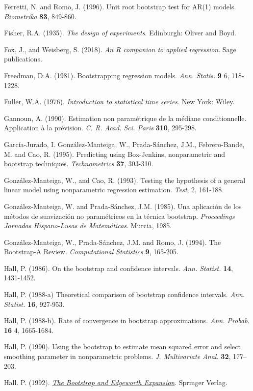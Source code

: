 \documentclass[
]{book}
\theoremstyle{break}
\theoremstyle{nonumberplain}
\begin{document}
Ferretti, N. and Romo, J. (1996). Unit root bootstrap test for AR(1)
models. \emph{Biometrika} \textbf{83}, 849-860.

Fisher, R.A. (1935). \emph{The design of experiments}. Edinburgh: Oliver and Boyd.

Fox, J., and Weisberg, S. (2018). \emph{An R companion to applied regression}. Sage publications.

Freedman, D.A. (1981). Bootstrapping regression models.
\emph{Ann. Statis.} \textbf{9} 6, 118-1228.

Fuller, W.A. (1976). \emph{Introduction to statistical time series}. New York:
Wiley.

Gannoun, A. (1990). Estimation non paramétrique de la médiane
conditionnelle. Application à la prévision. \emph{C. R. Acad. Sci. Paris}
\textbf{310}, 295-298.

García-Jurado, I. González-Manteiga, W., Prada-Sánchez, J.M.,
Febrero-Bande, M. and Cao, R. (1995). Predicting using Box-Jenkins,
nonparametric and bootstrap techniques. \emph{Technometrics} \textbf{37}, 303-310.

González-Manteiga, W., and Cao, R. (1993). Testing the hypothesis of a general linear model using nonparametric regression estimation. \emph{Test}, 2, 161-188.

González-Manteiga, W. and Prada-Sánchez, J.M. (1985). Una aplicación de
los métodos de suavización no paramétricos en la técnica bootstrap.
\emph{Proceedings Jornadas Hispano-Lusas de Matemáticas}. Murcia, 1985.

González-Manteiga, W., Prada-Sánchez, J.M. and Romo, J. (1994). The
Bootstrap-A Review. \emph{Computational Statistics} \textbf{9}, 165-205.

Hall, P. (1986). On the bootstrap and confidence intervals.
\emph{Ann. Statist.} \textbf{14}, 1431-1452.

Hall, P. (1988-a) Theoretical comparison of bootstrap confidence
intervals. \emph{Ann. Statist.} \textbf{16}, 927-953.

Hall, P. (1988-b). Rate of convergence in bootstrap approximations.
\emph{Ann. Probab.} \textbf{16} 4, 1665-1684.

Hall, P. (1990). Using the bootstrap to estimate mean squared error and
select smoothing parameter in nonparametric problems.
\emph{J. Multivariate Anal.} \textbf{32}, 177--203.

Hall. P. (1992). \href{https://books.google.es/books?hl=es&lr=&id=CwLaBwAAQBAJ&oi=fnd&pg=PR11&dq=The+Bootstrap+and+Edgeworth+Expansion}{\emph{The Bootstrap and Edgeworth Expansion}}. Springer Verlag.
\end{document}
